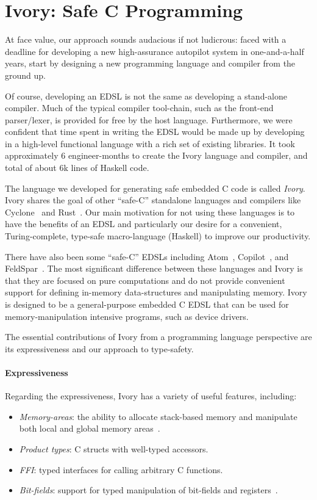 \section{Ivory: Safe C Programming}
\label{sec:ivory}

At face value, our approach sounds audacious if not ludicrous: faced with a
deadline for developing a new high-assurance autopilot system in one-and-a-half
years, start by designing a new programming language and compiler from the
ground up.

Of course, developing an EDSL is not the same as developing a stand-alone
compiler.  Much of the typical compiler tool-chain, such as the front-end
parser/lexer, is provided for free by the host language.  Furthermore, we were
confident that time spent in writing the EDSL would be made up by developing in
a high-level functional language with a rich set of existing libraries. It took
approximately 6 engineer-months to create the Ivory language and compiler, and
total of about 6k lines of Haskell code.

The language we developed for generating safe embedded C code is called
\emph{Ivory}.  Ivory shares the goal of other ``safe-C'' standalone languages
and compilers like Cyclone~\cite{cyclone} and Rust~\cite{rust}.  Our main
motivation for not using these languages is to have the benefits of an EDSL and
particularly our desire for a convenient, Turing-complete, type-safe
macro-language (Haskell) to improve our productivity.

There have also been some ``safe-C'' EDSLs including Atom~\cite{atom},
Copilot~\cite{copilot}, and FeldSpar~\cite{feldspar1}.  The most significant
difference between these languages and Ivory is that they are focused on pure
computations and do not provide convenient support for defining in-memory
data-structures and manipulating memory.  Ivory is designed to be a
general-purpose embedded C EDSL that can be used for memory-manipulation
intensive programs, such as device drivers.

The essential contributions of Ivory from a programming language perspective are
its expressiveness and our approach to type-safety.

\paragraph{Expressiveness}
Regarding the expressiveness, Ivory has a variety of useful features, including:
\begin{itemize}
  \item \emph{Memory-areas}: the ability to allocate stack-based memory and
    manipulate both local and global memory areas~\cite{memareas}.
  \item \emph{Product types}: C structs with well-typed accessors.
  \item \emph{FFI}: typed interfaces for calling arbitrary C functions.
  \item \emph{Bit-fields}: support for typed manipulation of bit-fields and
    registers~\cite{high-level}.
\end{itemize}

